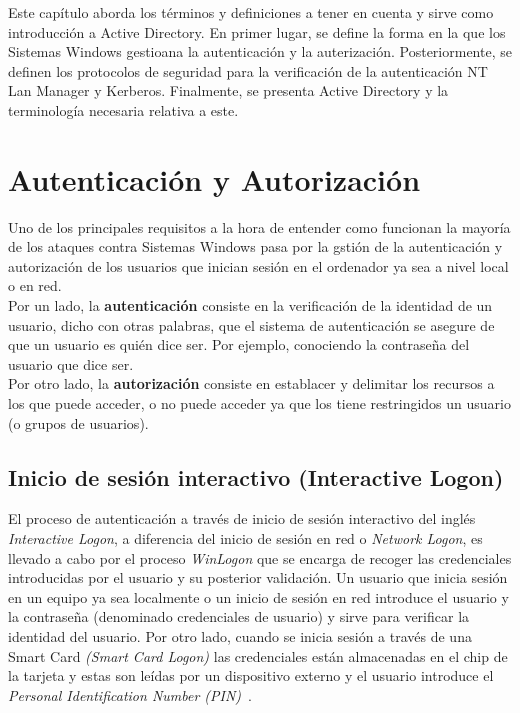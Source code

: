 Este capítulo aborda los términos y definiciones a tener en cuenta y sirve como introducción a Active Directory. En primer lugar, se define la forma en la que los Sistemas Windows gestioana la autenticación y la auterización. Posteriormente, se definen los protocolos de seguridad para la verificación de la autenticación NT Lan Manager y Kerberos. Finalmente, se presenta Active Directory y la terminología necesaria relativa a este.\\

\section{Autenticación y Autorización}

Uno de los principales requisitos a la hora de entender como funcionan la mayoría de los ataques contra Sistemas Windows pasa por la gstión de la autenticación y autorización de los usuarios que inician sesión en el ordenador ya sea a nivel local o en red.\\

Por un lado, la \textbf{autenticación} consiste en la verificación de la identidad de un usuario, dicho con otras palabras, que el sistema de autenticación se asegure de que un usuario es quién dice ser. Por ejemplo, conociendo la contraseña del usuario que dice ser.\\

Por otro lado, la \textbf{autorización} consiste en establacer y delimitar los recursos a los que puede acceder, o no puede acceder ya que los tiene restringidos un usuario (o grupos de usuarios).\\


\subsection{Inicio de sesión interactivo (Interactive Logon)}

El proceso de autenticación a través de inicio de sesión interactivo del inglés {\it Interactive Logon}, a diferencia del inicio de sesión en red o {\it Network Logon}, es llevado a cabo por el proceso {\it WinLogon} que se encarga de recoger las credenciales introducidas por el usuario y su posterior validación. Un usuario que inicia sesión en un equipo ya sea localmente o un inicio de sesión en red introduce el usuario y la contraseña (denominado credenciales de usuario) y sirve para verificar la identidad del usuario. Por otro lado, cuando se inicia sesión a través de una Smart Card {\it (Smart Card Logon)} las credenciales están almacenadas en el chip de la tarjeta y estas son leídas por un dispositivo externo y el usuario introduce el {\it Personal Identification Number (PIN)}~\cite{Capitulo2:Logon}.\\

